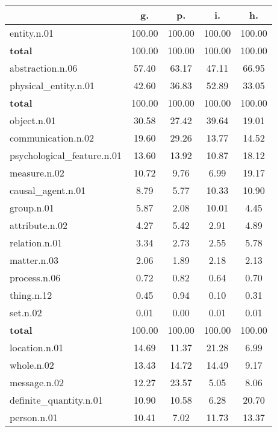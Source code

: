 \begin{table}[h!]
\begin{center}
\begin{tabular}{| l || c | c | c | c |}\hline
 & {\bf g.} & {\bf p.} & {\bf i.} & {\bf h.} \\\hline\hline
entity.n.01 & 100.00  & 100.00  & 100.00  & 100.00 \\\hline\hline
{{\bf total}} & 100.00  & 100.00  & 100.00  & 100.00 \\\hline\hline\hline
abstraction.n.06 & 57.40  & 63.17  & 47.11  & 66.95 \\\hline
physical\_entity.n.01 & 42.60  & 36.83  & 52.89  & 33.05 \\\hline\hline
{{\bf total}} & 100.00  & 100.00  & 100.00  & 100.00 \\\hline\hline\hline
object.n.01 & 30.58  & 27.42  & 39.64  & 19.01 \\\hline
communication.n.02 & 19.60  & 29.26  & 13.77  & 14.52 \\\hline
psychological\_feature.n.01 & 13.60  & 13.92  & 10.87  & 18.12 \\\hline
measure.n.02 & 10.72  & 9.76  & 6.99  & 19.17 \\\hline
causal\_agent.n.01 & 8.79  & 5.77  & 10.33  & 10.90 \\\hline
group.n.01 & 5.87  & 2.08  & 10.01  & 4.45 \\\hline
attribute.n.02 & 4.27  & 5.42  & 2.91  & 4.89 \\\hline
relation.n.01 & 3.34  & 2.73  & 2.55  & 5.78 \\\hline
matter.n.03 & 2.06  & 1.89  & 2.18  & 2.13 \\\hline
process.n.06 & 0.72  & 0.82  & 0.64  & 0.70 \\\hline
thing.n.12 & 0.45  & 0.94  & 0.10  & 0.31 \\\hline
set.n.02 & 0.01  & 0.00  & 0.01  & 0.01 \\\hline\hline
{{\bf total}} & 100.00  & 100.00  & 100.00  & 100.00 \\\hline\hline\hline
location.n.01 & 14.69  & 11.37  & 21.28  & 6.99 \\\hline
whole.n.02 & 13.43  & 14.72  & 14.49  & 9.17 \\\hline
message.n.02 & 12.27  & 23.57  & 5.05  & 8.06 \\\hline
definite\_quantity.n.01 & 10.90  & 10.58  & 6.28  & 20.70 \\\hline
person.n.01 & 10.41  & 7.02  & 11.73  & 13.37 \\\hline

\end{tabular}
\end{center}
\end{table}
